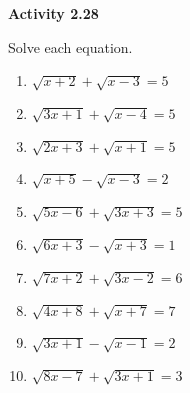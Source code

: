 \vspace{1ex}
\noindent\textbf{Activity 2.28}

\vspace{0.75ex}

Solve each equation.

\begin{multicols}{2}
\begin{enumerate}[noitemsep, label = \color{blue}\arabic*. ]
    \item \( \sqrt{x + 2} + \sqrt{x - 3} = 5 \)
    \item \( \sqrt{3x + 1} + \sqrt{x - 4} = 5 \)
    \item \( \sqrt{2x + 3} + \sqrt{x + 1} = 5 \)
    \item \( \sqrt{x + 5} - \sqrt{x - 3} = 2 \)
    \item \( \sqrt{5x - 6} + \sqrt{3x + 3} = 5 \)
    \item \( \sqrt{6x + 3} - \sqrt{x + 3} = 1 \)
    \item \( \sqrt{7x + 2} + \sqrt{3x - 2} = 6 \)
    \item \( \sqrt{4x + 8} + \sqrt{x + 7} = 7 \)
    \item \( \sqrt{3x + 1} - \sqrt{x - 1} = 2 \)
    \item \( \sqrt{8x - 7} + \sqrt{3x + 1} = 3 \)
\end{enumerate}
\end{multicols}
